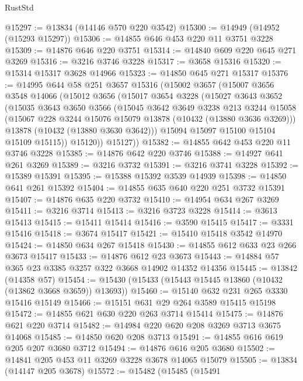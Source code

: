 \begin{lexlean}{RustStd}
\begin{coremodule}
@15297 := @13834 (@14146 @570 @220 @3542)
@15300 := @14949 (@14952 (@15293 @15297))
@15306 := @14855 @646 @453 @220 @11 @3751 @3228
@15309 := @14876 @646 @220 @3751
@15314 := @14840 @609 @220 @645 @271 @3269
@15316 := @3216 @3746 @3228
@15317 := @3658 @15316
@15320 := @15314 @15317 @3628 @14966
@15323 := @14850 @645 @271 @15317
@15376 := @14995
    @644
    @58
    @251
    @3657
    @15316
    (@15002
      @3657
      (@15007
        @3656
        @3548
        @14066
        (@15012
          @3656
          (@15017
            @3654
            @3228
            (@15027
              @3643
              @3652
              (@15035
                @3643
                @3650
                @3566
                (@15045
                  @3642
                  @3649
                  @3238
                  @213
                  @3244
                  @15058
                  (@15067 @228 @3244 @15076 @15079 @13878 (@10432 (@13880 @3636 @3269)))
                  @13878
                  (@10432 (@13880 @3630 @3642)))
                @15094
                @15097
                @15100
                @15104
                @15109
                @15115))
            @15120))
        @15127))
@15382 := @14855 @642 @453 @220 @11 @3746 @3228
@15385 := @14876 @642 @220 @3746
@15388 := @14927 @641 @261 @3269
@15389 := @3216 @3732
@15391 := @3216 @3741 @3228
@15392 := @15389 @15391
@15395 := @15388 @15392 @3539 @14939
@15398 := @14850 @641 @261 @15392
@15404 := @14855 @635 @640 @220 @251 @3732 @15391
@15407 := @14876 @635 @220 @3732
@15410 := @14954 @634 @267 @3269
@15411 := @3216 @3714
@15413 := @3216 @3723 @3228
@15414 := @3613 @15413
@15415 := @15411 @15414
@15416 := @3590 @15415
@15417 := @3331 @15416
@15418 := @3674 @15417
@15421 := @15410 @15418 @3542 @14970
@15424 := @14850 @634 @267 @15418
@15430 := @14855 @612 @633 @23 @266 @3673 @15417
@15433 := @14876 @612 @23 @3673
@15443 := @14884 @57 @365 @23 @3385 @3257 @322 @3668 @14902 @14352 @14356
@15445 := @13842 (@14358 @57)
@15454 := @15430 (@15433 (@15443 @15445 @13860 (@10432 (@13862 @3668 @3659)) @13693))
@15460 := @15140 @632 @231 @265 @3330 @15416 @15149
@15466 := @15151 @631 @29 @264 @3589 @15415 @15198
@15472 := @14855 @621 @630 @220 @263 @3714 @15414
@15475 := @14876 @621 @220 @3714
@15482 := @14984 @220 @620 @208 @3269 @3713 @3675 @14068
@15485 := @14850 @620 @208 @3713
@15491 := @14855 @616 @619 @205 @207 @3680 @3712
@15494 := @14876 @616 @205 @3680
@15502 := @14841 @205 @453 @11 @3269 @3228 @3678 @14065 @15079
@15505 := @13834 (@14147 @205 @3678)
@15572 := @15482
    (@15485
      (@15491

\end{coremodule}
\end{lexlean}
